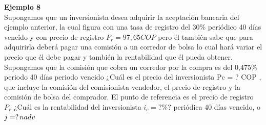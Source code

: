 \newpage
\textbf{Ejemplo 8}\\
Supongamos que un inversionista desea adquirir la aceptación bancaria del ejemplo anterior, la cual figura con una tasa de registro del 30\% periódico 40 días vencido y con precio de registro $P_r =  97,65 COP$ pero él también sabe que para adquirirla deberá pagar una comisión a un corredor de bolsa lo cual hará variar el precio que él debe pagar y también la rentabilidad que él pueda obtener. Supongamos que la comisión que cobra un corredor por la compra es del 0,475\% periodo 40 días periodo vencido ¿Cuál es el precio del inversionista Pc =  ? COP , que incluye la comisión del comisionista vendedor, el precio de registro y la comisión de bolsa del comprador. El punto de referencia es el precio de registro $P_r$ ¿Cuál es la rentabilidad del inversionista $i_c =? \%?$ periódica 40 días vencido, o $j=? \hspace{0.5mm} nadv$

